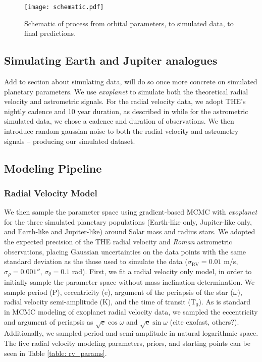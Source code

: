 \documentclass[twocolumn]{aastex631}
\newcommand{\dycomment}[1]{{\color{purple}#1}}
\begin{document}
\begin{figure}[htb] \label{fig: schematic}
    \centering 
    \texttt{[image: schematic.pdf]}
    \caption{Schematic of process from orbital parameters, to simulated data, to final predictions.}
\end{figure}


\subsection{Simulating Earth and Jupiter analogues}
\dycomment{Add to section about simulating data, will do so once more concrete on simulated planetary parameters.}
\linebreak 
We use \textit{exoplanet} to simulate both the theoretical radial velocity and astrometric signals. For the radial velocity data, we adopt THE's nightly cadence and 10 year duration, as described in \citet{Hall2018} while for the astrometric simulated data, we chose a cadence and duration of observations. We then introduce random gaussian noise to both the radial velocity and astrometry signals -- producing our simulated dataset. 



\subsection{Modeling Pipeline}
\subsubsection{Radial Velocity Model}
We then sample the parameter space using gradient-based MCMC with \textit{exoplanet} for the three simulated planetary populations (Earth-like only, Jupiter-like only, and Earth-like and Jupiter-like) around Solar mass and radius stars. We adopted the expected precision of the THE radial velocity and \textit{Roman} astrometric observations, placing Gaussian uncertainties on the data points with the same standard deviation as the those used to simulate the data ($\sigma_{\textrm{RV}} = 0.01$ m/s, $\sigma_{\rho} = 0.001 ''$, $\sigma_{\theta} = 0.1$ rad). First, we fit a radial velocity only model, in order to initially sample the parameter space without mass-inclination determination. We sample period (P), eccentricity (e), argument of the periapsis of the star ($\omega$), radial velocity semi-amplitude (K), and the time of transit (T$_0$). As is standard in MCMC modeling of exoplanet radial velocity data, we sampled the eccentricity and argument of periapsis as $\sqrt{\textrm{e}}\cos{\omega}$ and $\sqrt{\textrm{e}}\sin{\omega}$ \dycomment{(cite exofast, others?)}. Additionally, we sampled period and semi-amplitude in natural logarithmic space. The five radial velocity modeling parameters, priors, and starting points can be seen in Table \ref{table: rv_params}. 
\end{document}
